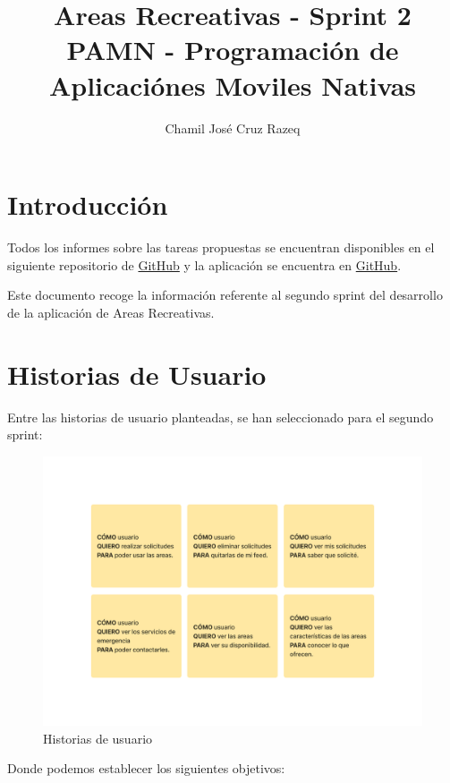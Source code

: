 \documentclass{article}
\title{Areas Recreativas - Sprint 2 \\[3ex] \small PAMN - Programación de Aplicaciónes Moviles Nativas}
\author{Chamil José Cruz Razeq}
\begin{document}
    \maketitle
    \thispagestyle{empty}
    \newpage

    \section{Introducción}
        Todos los informes sobre las tareas propuestas se encuentran disponibles en el
         siguiente repositorio de \href{https://github.com/chamilstudy/ulpgc_pamn_labs}{GitHub}
         y la aplicación se encuentra en \href{https://github.com/chamilstudy/pamn_proyecto_final}{GitHub}.

        Este documento recoge la información referente al segundo sprint del desarrollo de la
         aplicación de Areas Recreativas.
    
    \section{Historias de Usuario}

    Entre las historias de usuario planteadas, se han seleccionado para el segundo sprint:
    
    \begin{figure}[H]
        \centerline{\includegraphics[scale=0.4]{historias.png}}
        \caption{Historias de usuario}
        \label{fig:historias}
    \end{figure}

    Donde podemos establecer los siguientes objetivos:
\end{document}
